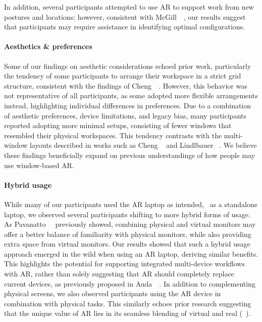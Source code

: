 In addition, several participants attempted to use AR to support work from new postures and locations; however, consistent with McGill~\etal~\cite{mcgill2020seatedvrworkspace}, our results suggest that participants may require assistance in identifying optimal configurations.

\paragraph{Aesthetics \& preferences}
Some of our findings on aesthetic considerations echoed prior work, particularly the tendency of some participants to arrange their workspace in a strict grid structure, consistent with the findings of Cheng~\etal~\cite{cheng2021semanticadapt}. 
However, this behavior was not representative of all participants, as some adopted more flexible arrangements instead, highlighting individual differences in preferences. 
Due to a combination of aesthetic preferences, device limitations, and legacy bias, many participants reported adopting more minimal setups, consisting of fewer windows that resembled their physical workspaces. This tendency contrasts with the multi-window layouts described in works such as Cheng \etal~\cite{cheng2021semanticadapt} and Lindlbauer \etal~\cite{lindlbauer2019contextaware}.
We believe these findings beneficially expand on previous understandings of how people may use window-based AR.

\paragraph{Hybrid usage}
While many of our participants used the AR laptop as intended, \ie~as a standalone laptop, 
we observed several participants shifting to
more hybrid forms of usage. 
As Pavanatto~\etal~\cite{pavanatto2021virtualmonitor} previously showed, combining physical and virtual monitors may offer a better balance of familiarity with physical monitors, while also providing extra space from virtual monitors.
Our results showed that such a hybrid usage approach emerged in the wild when using an AR laptop, deriving similar benefits.
This highlights the potential for supporting integrated multi-device workflows with AR, rather than solely suggesting that AR should completely replace current devices, as previously proposed in Auda~\etal~\cite{auda2023crossreality}.
In addition to complementing physical screens, we also observed participants using the AR device in combination with physical tasks. 
This similarly echoes prior research suggesting that the unique value of AR lies in its seamless blending of virtual and real (\eg~\cite{lindlbauer2019contextaware}).


